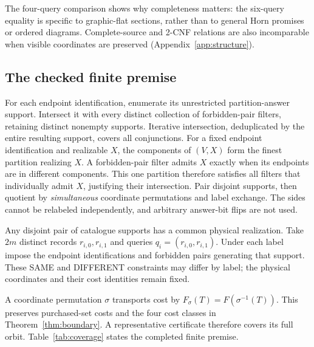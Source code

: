 \documentclass[pdflatex,sn-mathphys-num]{sn-jnl}
\theoremstyle{thmstyleone}
\theoremstyle{thmstylethree}
\theoremstyle{thmstyletwo}
\begin{document}
The four-query comparison shows why completeness matters: the six-query equality is specific to graphic-flat sections, rather than to general Horn promises or ordered diagrams. Complete-source and 2-CNF relations are also incomparable when visible coordinates are preserved (Appendix~\ref{app:structure}).

\subsection{The checked finite premise}\label{sec:premise}
For each endpoint identification, enumerate its unrestricted partition-answer support. Intersect it with every distinct collection of forbidden-pair filters, retaining distinct nonempty supports. Iterative intersection, deduplicated by the entire resulting support, covers all conjunctions. For a fixed endpoint identification and realizable $X$, the components of $(V,X)$ form the finest partition realizing $X$. A forbidden-pair filter admits $X$ exactly when its endpoints are in different components. This one partition therefore satisfies all filters that individually admit $X$, justifying their intersection. Pair disjoint supports, then quotient by \emph{simultaneous} coordinate permutations and label exchange. The sides cannot be relabeled independently, and arbitrary answer-bit flips are not used.

Any disjoint pair of catalogue supports has a common physical realization. Take $2m$ distinct records $r_{i,0},r_{i,1}$ and queries $q_i=(r_{i,0},r_{i,1})$. Under each label impose the endpoint identifications and forbidden pairs generating that support. These SAME and DIFFERENT constraints may differ by label; the physical coordinates and their cost identities remain fixed.

A coordinate permutation $\sigma$ transports cost by $F_\sigma(T)=F(\sigma^{-1}(T))$. This preserves purchased-set costs and the four cost classes in Theorem~\ref{thm:boundary}. A representative certificate therefore covers its full orbit. Table~\ref{tab:coverage} states the completed finite premise.
\end{document}
